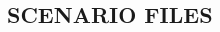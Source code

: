 \documentclass[Space_Shuttle_Ultra_Manual.tex]{subfiles}
\begin{document}
\begin{multicols}{2}
\section{\large SCENARIO FILES}

\end{multicols}
\end{document}
